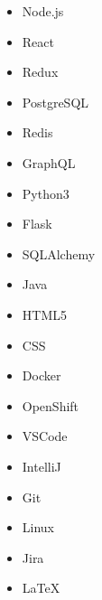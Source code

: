 

\begin{multicols}{5}
	\begin{itemize}
		\item Node.js
		\item React
		\item Redux
		\item PostgreSQL
		\item Redis
		\item GraphQL
		\item Python3
		\item Flask
		\item SQLAlchemy
		\item Java
		\item HTML5
		\item CSS
		\item Docker
		\item OpenShift
		\item VSCode
		\item IntelliJ
		\item Git
		\item Linux
		\item Jira
		\item LaTeX
	\end{itemize}
\end{multicols}

